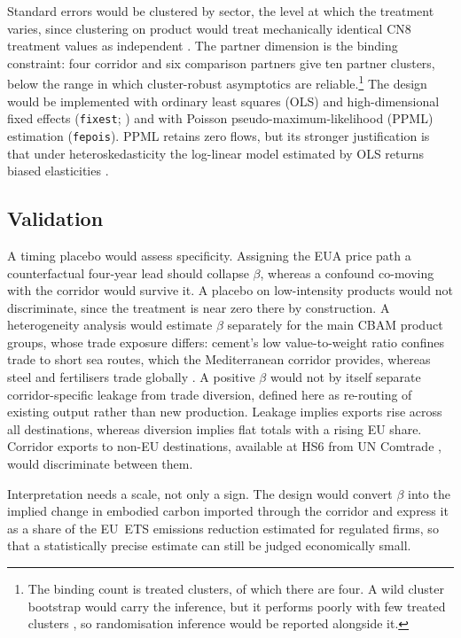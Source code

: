 Standard errors would be clustered by sector, the level at which the treatment varies, since clustering on product would treat mechanically identical CN8 treatment values as independent \citep{cameron2011}. The partner dimension is the binding constraint: four corridor and six comparison partners give ten partner clusters, below the range in which cluster-robust asymptotics are reliable.\footnote{The binding count is treated clusters, of which there are four. A wild cluster bootstrap would carry the inference, but it performs poorly with few treated clusters \citep{mackinnon2018}, so randomisation inference would be reported alongside it.} The design would be implemented with ordinary least squares (OLS) and high-dimensional fixed effects (\texttt{fixest}; \citealp{berge2021}) and with Poisson pseudo-maximum-likelihood (PPML) estimation (\texttt{fepois}). PPML retains zero flows, but its stronger justification is that under heteroskedasticity the log-linear model estimated by OLS returns biased elasticities \citep{santos2006}.

\subsection{Validation}

A timing placebo would assess specificity. Assigning the EUA price path a counterfactual four-year lead should collapse $\beta$, whereas a confound co-moving with the corridor would survive it. A placebo on low-intensity products would not discriminate, since the treatment is near zero there by construction. A heterogeneity analysis would estimate $\beta$ separately for the main CBAM product groups, whose trade exposure differs: cement's low value-to-weight ratio confines trade to short sea routes, which the Mediterranean corridor provides, whereas steel and fertilisers trade globally \citep{branger2016}. A positive $\beta$ would not by itself separate corridor-specific leakage from trade diversion, defined here as re-routing of existing output rather than new production. Leakage implies exports rise across all destinations, whereas diversion implies flat totals with a rising EU share. Corridor exports to non-EU destinations, available at HS6 from UN Comtrade \citep{comtrade}, would discriminate between them.

Interpretation needs a scale, not only a sign. The design would convert $\beta$ into the implied change in embodied carbon imported through the corridor and express it as a share of the EU~ETS emissions reduction estimated for regulated firms, so that a statistically precise estimate can still be judged economically small.

